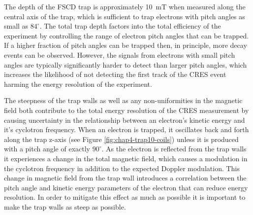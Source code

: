 \begin{table}[htbp]
\begin{minipage}{0.7\textwidth}
    \end{minipage}
    \label{fig:chap4-trap10-coils}
\end{table}

The depth of the FSCD trap is approximately 10~mT when measured along the central axis of the trap, which is sufficient to trap electrons with pitch angles as small as $84^\circ$. The total trap depth factors into the total efficiency of the experiment by controlling  the range of electron pitch angles that can be trapped. If a higher fraction of pitch angles can be trapped then, in principle, more decay events can be observed. However, the signals from electrons with small pitch angles are typically significantly harder to detect than larger pitch angles, which increases the likelihood of not detecting the first track of the CRES event harming the energy resolution of the experiment. 

The steepness of the trap walls as well as any non-uniformities in the magnetic field both contribute to the total energy resolution of the CRES measurement by causing uncertainty in the relationship between an electron's kinetic energy and it's cyclotron frequency. When an electron is trapped, it oscillates back and forth along the trap z-axis (see Figure \ref{fig:chap4-trap10-coils}) unless it is produced with a pitch angle of exactly $90^\circ$. As the electron is reflected from the trap walls it experiences a change in the total magnetic field, which causes a modulation in the cyclotron frequency in addition to the expected Doppler modulation. This change in magnetic field from the trap wall introduces a correlation between the pitch angle and kinetic energy parameters of the electron that can reduce energy resolution. In order to mitigate this effect as much as possible it is important to make the trap walls as steep as possible. 




